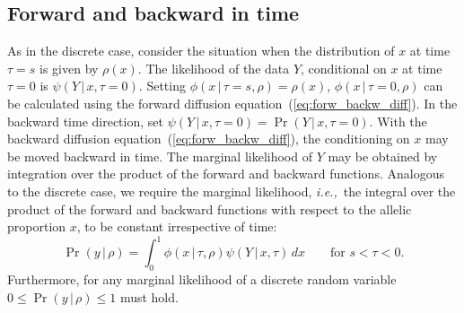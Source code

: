 \documentclass[preprint]{elsarticle}
\newcommand\given{{\,|\,}}
\newcommand\ie{{\it i.e.,}}
\newcommand\y{\ensuremath{Y}}
\newcommand\s{\ensuremath{s}}
\begin{document}
\subsection{Forward and backward in time}

As in the discrete case, consider the situation when the distribution of $x$ at time $\tau=\s$ is given by $\rho(x)$. The likelihood of the data $\y$, conditional on $x$ at time $\tau=0$ is $\psi(\y\given x,\tau=0)$. Setting $\phi(x\given \tau=\s,\rho)=\rho(x)$, $\phi(x\given \tau=0,\rho)$ can be calculated using the forward diffusion equation~(\ref{eq:forw_backw_diff}). In the backward time direction, set  $\psi(\y\given x,\tau=0)=\Pr(\y\given x,\tau=0)$. With the backward diffusion equation~(\ref{eq:forw_backw_diff}), the conditioning on $x$ may be moved backward in time. The marginal likelihood of $\y$ may be obtained by integration over the product of the forward and backward functions. Analogous to the discrete case, we require the marginal likelihood, \ie\ the integral over the product of the forward and backward functions with respect to the allelic proportion $x$, to be constant irrespective of time:
\begin{equation}\label{eq:marg_like}
\Pr(y\given\rho) = \int_{0}^{1} \phi(x\given \tau,\rho)\psi(\y\given x,\tau)  \,dx \qquad\text{for $s<\tau<0$.}
\end{equation}
Furthermore, for any marginal likelihood of a discrete random variable $0\leq \Pr(y\given\rho) \leq 1$ must hold.
\end{document}

